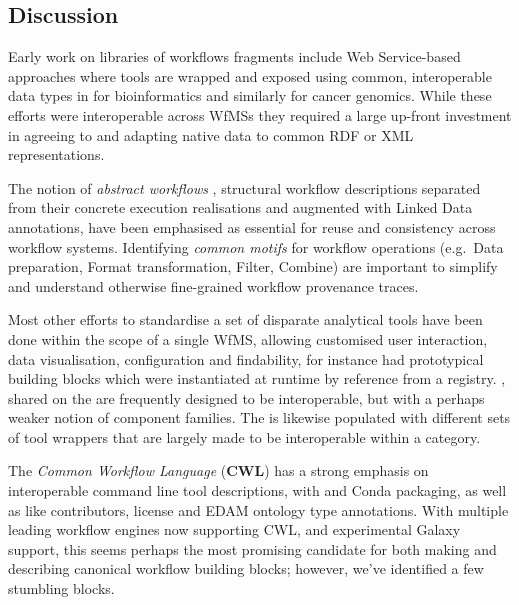 \subsection{Discussion}\label{ch6:discussion}

Early work on libraries of workflows fragments include Web Service-based approaches where tools are wrapped and exposed using common, interoperable data types in  \cite{ch6-27} for bioinformatics and similarly  \cite{ch6-28} for cancer genomics.
While these efforts were interoperable across WfMSs they required a large up-front investment in agreeing to and adapting native data to common RDF or XML representations.

The notion of \emph{abstract workflows} \cite{Garijo 2011}, structural workflow descriptions separated from their concrete execution realisations and augmented with Linked Data annotations, have been emphasised as essential for reuse and consistency across workflow systems.
Identifying \emph{common motifs} for workflow operations \cite{ch6-30} (e.g.~Data preparation, Format transformation, Filter, Combine) are important to simplify and understand otherwise fine-grained workflow provenance traces.

Most other efforts to standardise a set of disparate analytical tools have been done within the scope of a single WfMS, allowing customised user interaction, data visualisation, configuration and findability, for instance  had prototypical building blocks \cite{ch6-31} which were instantiated at runtime by reference from a registry. 
, shared on the  are frequently designed to be interoperable, but with a perhaps weaker notion of component families.
The  \cite{ch6-32} is likewise populated with different sets of tool wrappers that are largely made to be interoperable within a category.

The \emph{Common Workflow Language} (\textbf{CWL}) \cite{Crusoe 2022} has a strong emphasis on interoperable command line tool descriptions, with  and Conda packaging, as well as  like contributors, license and EDAM ontology type annotations.
With multiple leading workflow engines now supporting CWL, and experimental Galaxy support, this seems perhaps the most promising candidate for both making and describing canonical workflow building blocks; however, we've identified a few stumbling blocks.

